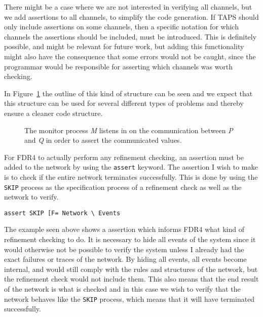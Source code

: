 There might be a case where we are not interested in verifying all channels, but we add assertions to all channels, to simplify the code generation. If TAPS should only include assertions on some channels, then a specific notation for which channels the assertions should be included, must be introduced. This is definitely possible, and might be relevant for future work, but adding this functionality might also have the consequence that some errors would not be caught, since the programmar would be responsible for asserting which channels was worth checking.

In Figure~\ref{fig:assertion_process} the outline of this kind of structure can be seen and we expect that this structure can be used for several different types of problems and thereby ensure a cleaner code structure.
\begin{figure}[!ht]
  \centering
  \caption{The monitor process \textit{M} listens in on the communication between \textit{P} and \textit{Q} in order to assert the communicated values.}
  \label{fig:assertion_process}
\end{figure}

For FDR4 to actually perform any refinement checking, an assertion must be added to the network by using the \texttt{assert} keyword. The assertion I wish to make is to check if the entire network terminates successfully. This is done by using the \texttt{SKIP} process as the specification process of a refinement check as well as the network to verify.
\begin{verbatim}
assert SKIP [F= Network \ Events
\end{verbatim}
The example seen above shows a \cspm{} assertion which informs FDR4 what kind of refinement checking to do.
It is necessary to hide all events of the system since it would otherwise not be possible to verify the system unless I already had the exact failures or traces of the network. By hiding all events, all events become internal, and would still comply with the rules and structures of the network, but the refinement check would not include them. This also means that the end result of the network is what is checked and in this case we wish to verify that the network behaves like the \texttt{SKIP} process, which means that it will have terminated successfully.

